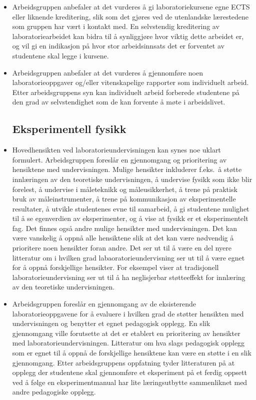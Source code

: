 \documentclass{article}
\begin{document}
\begin{itemize}
  \item Arbeidsgruppen anbefaler at det vurderes å gi laboratoriekursene egne ECTS eller liknende kreditering, slik som det gjøres ved de utenlandske lærestedene som gruppen har vært i kontakt med. En selvstendig kreditering av laboratoriearbeidet kan bidra til å synliggjøre hvor viktig dette arbeidet er, og vil gi en indikasjon på hvor stor arbeidsinnsats det er forventet av studentene skal legge i kursene.

  \item Arbeidsgruppen anbefaler at det vurderes å gjennomføre noen laboratorieoppgaver og/eller vitenskapelige rapporter som individuelt arbeid. Etter arbeidsgruppens syn kan individuelt arbeid forberede studentene på den grad av selvstendighet som de kan forvente å møte i arbeidslivet.
  
\subsection{Eksperimentell fysikk}

  \item Hovedhensikten ved laboratorieundervisningen kan synes noe uklart formulert. Arbeidsgruppen foreslår en gjennomgang og prioritering av hensiktene med undervisningen. Mulige hensikter inkluderer f.eks.~å støtte innlæringen av den teoretiske undervisningen, å undervise fysikk som ikke blir forelest, å undervise i måleteknikk og måleusikkerhet, å trene på praktisk bruk av måleinstrumenter, å trene på kommunikasjon av eksperimentelle resultater, å utvikle studentenes evne til samarbeid, å gi studentene mulighet til å se egenverdien av eksperimenter, og å vise at fysikk er et eksperimentelt fag. Det finnes også andre mulige hensikter med undervisningen. Det kan være vanskelig å oppnå alle hensiktene slik at det kan være nødvendig å prioritere noen hensikter foran andre. Det ser ut til å være en del nyere litteratur om i hvilken grad labaoratorieundervisning ser ut til å være egnet for å oppnå forskjellige hensikter. For eksempel viser \citet{Holmes} at tradisjonell laboratorieundervisning ser ut til å ha neglisjerbar støtteeffekt for innlæring av den teoretiske undervisningen.
   
  \item Arbeidsgruppen foreslår en gjennomgang av de eksisterende laboratorieoppgavene for å evaluere i hvilken grad de støtter hensikten med undervisningen og benytter et egnet pedagogisk opplegg. En slik gjennomgang ville forutsette at det er etablert en prioritering av hensikter med laboratorieundervisningen. Litteratur om hva slags pedagogisk opplegg som er egnet til å oppnå de forskjellige hensiktene kan være en støtte i en slik gjennomgang. Etter arbeidsgruppens oppfatning tyder litteraturen på at opplegg der studentene skal gjennomføre et eksperiment på et ferdig oppsett ved å følge en eksperimentmanual har lite læringsutbytte sammenliknet med andre pedagogiske opplegg.




\end{itemize}
\end{document}

